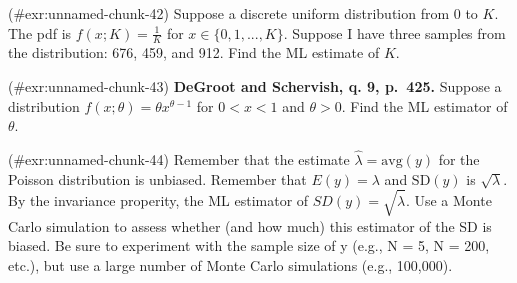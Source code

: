\documentclass[
]{book}
\begin{document}

\protect\hypertarget{exr:unnamed-chunk-42}{}{(\#exr:unnamed-chunk-42)
}Suppose a discrete uniform distribution from 0 to \(K\). The pdf is
\(f(x; K) = \frac{1}{K}\) for \(x \in \{0, 1, ..., K\}\). Suppose I have
three samples from the distribution: 676, 459, and 912. Find the ML
estimate of \(K\). 


\protect\hypertarget{exr:unnamed-chunk-43}{}{(\#exr:unnamed-chunk-43)
}\textbf{DeGroot and Schervish, q. 9, p.~425.} Suppose a distribution
\(f(x; \theta) = \theta x^{\theta - 1}\) for \(0 < x < 1\) and
\(\theta > 0\). Find the ML estimator of \(\theta\).


\protect\hypertarget{exr:unnamed-chunk-44}{}{(\#exr:unnamed-chunk-44)
}Remember that the estimate \(\hat{\lambda} = \text{avg}(y)\) for the
Poisson distribution is unbiased. Remember that \(E(y) = \lambda\) and
\(\text{SD}(y)\) is \(\sqrt{\lambda}\). By the invariance properity, the
ML estimator of \(SD(y) = \sqrt{\hat{\lambda}}\). Use a Monte Carlo
simulation to assess whether (and how much) this estimator of the SD is
biased. Be sure to experiment with the sample size of y (e.g., N = 5, N
= 200, etc.), but use a large number of Monte Carlo simulations (e.g.,
100,000). 

\backmatter
\end{document}
